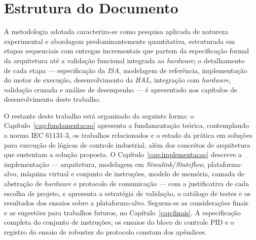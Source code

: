 \section{Estrutura do Documento}
\label{sec:organizacao}

A metodologia adotada caracteriza-se como pesquisa aplicada de natureza experimental e abordagem predominantemente quantitativa, estruturada em etapas sequenciais com entregas incrementais que partem da especificação formal da arquitetura até a validação funcional integrada ao \textit{hardware}; o detalhamento de cada etapa --- especificação da \textit{ISA}, modelagem de referência, implementação do motor de execução, desenvolvimento da \textit{HAL}, integração com \textit{hardware}, validação cruzada e análise de desempenho --- é apresentado nos capítulos de desenvolvimento deste trabalho.

O restante deste trabalho está organizado da seguinte forma: o Capítulo~\ref{cap:fundamentacao} apresenta a fundamentação teórica, contemplando a norma IEC 61131-3, os trabalhos relacionados e o estado da prática em soluções para execução de lógicas de controle industrial, além dos conceitos de arquitetura que sustentam a solução proposta.
O Capítulo~\ref{cap:implementacao} descreve a implementação --- arquitetura, modelagem em \textit{Simulink}/\textit{Stateflow}, plataforma-alvo, máquina virtual e conjunto de instruções, modelo de memória, camada de abstração de \textit{hardware} e protocolo de comunicação --- com a justificativa de cada escolha de projeto, e apresenta a estratégia de validação, o catálogo de testes e os resultados dos ensaios sobre a plataforma-alvo.
Seguem-se as considerações finais e as sugestões para trabalhos futuros, no Capítulo~\ref{cap:finais}.
A especificação completa do conjunto de instruções, os ensaios do bloco de controle PID e o registro do ensaio de robustez do protocolo constam dos apêndices.
